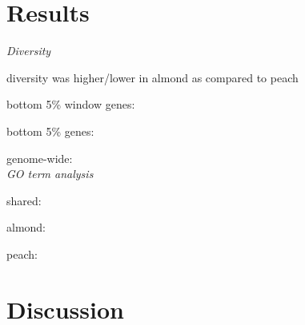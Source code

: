\documentclass[12pt]{article}
\begin{document}




\section*{Results}
\emph{Diversity}

diversity was higher/lower in almond as compared to peach

bottom 5\% window genes: %

bottom 5\% genes: %

genome-wide:
%
\\
%
\emph{GO term analysis}

shared:

almond:

peach:

\section*{Discussion}
\end{document}
